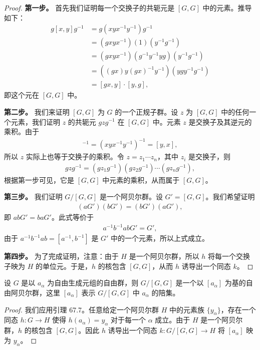 \documentclass[../../main.tex]{subfiles}
\begin{document}
\begin{proof}
\textbf{第一步。} 首先我们证明每一个交换子的共轭元是 $[G,G]$ 中的元素。推导如下：
\begin{align*}
g[x,y]g^{-1}&=g(xyx^{-1}y^{-1})g^{-1}\\
&=(gxyx^{-1})(1)(y^{-1}g^{-1})\\
&=(gxyx^{-1})(g^{-1}y^{-1}yg)(y^{-1}g^{-1})\\
&=((gx)y(gx)^{-1}y^{-1})(ygy^{-1}g^{-1})\\
&=[gx,y]\cdot[y,g],
\end{align*}
即这个元在 $[G,G]$ 中。

\textbf{第二步。} 我们来证明 $[G,G]$ 为 $G$ 的一个正规子群。设 $z$ 为 $[G,G]$ 中的任何一个元素，我们证明 $z$ 的共轭元 $gzg^{-1}$ 在 $[G,G]$ 中。元素 $z$ 是交换子及其逆元的乘积。由于
\begin{align*}
[x,y]^{-1}=(xyx^{-1}y^{-1})^{-1}=[y,x],
\end{align*}
所以 $z$ 实际上也等于交换子的乘积。令 $z=z_1\cdots z_n$，其中 $z_i$ 是交换子，则
\begin{align*}
gzg^{-1}=(gz_1g^{-1})(gz_2g^{-1})\cdots(gz_ng^{-1}),
\end{align*}
根据第一步可见，它是 $[G,G]$ 中元素的乘积，从而属于 $[G,G]$。

\textbf{第三步。} 我们证明 $G/[G,G]$ 是一个阿贝尔群。设 $G'=[G,G]$。我们希望证明
\begin{align*}
(aG')(bG')=(bG')(aG'),
\end{align*}
即 $abG'=baG'$。此式等价于
\begin{align*}
a^{-1}b^{-1}abG'=G',
\end{align*}
由于 $a^{-1}b^{-1}ab=[a^{-1},b^{-1}]$ 是 $G'$ 中的一个元素，所以上式成立。

\textbf{第四步。} 为了完成证明，注意：由于 $H$ 是一个阿贝尔群，所以 $h$ 将每一个交换子映为 $H$ 的单位元。于是，$h$ 的核包含 $[G,G]$，从而 $h$ 诱导出一个同态 $k$。
\end{proof}

\begin{theorem}\label{theorem:ch11-abelianization-of-free-group}
设 $G$ 是以 $a_\alpha$ 为自由生成元组的自由群，则 $G/[G,G]$ 是一个以 $[a_\alpha]$ 为基的自由阿贝尔群，这里 $[a_\alpha]$ 表示 $G/[G,G]$ 中 $a_\alpha$ 的陪集。
\end{theorem}

\begin{proof}
我们应用引理 67.7。任意给定一个阿贝尔群 $H$ 中的元素族 $\{y_\alpha\}$，存在一个同态 $h:G\to H$ 使得 $h(a_\alpha)=y_\alpha$ 对于每一个 $\alpha$ 成立。由于 $H$ 是一个阿贝尔群，$h$ 的核包含 $[G,G]$。因此 $h$ 诱导出一个同态 $k:G/[G,G]\to H$ 将 $[a_\alpha]$ 映为 $y_\alpha$。
\end{proof}
\end{document}
